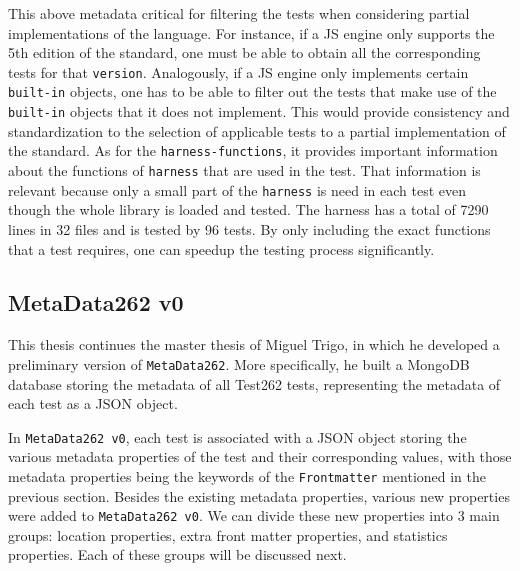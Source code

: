 \documentclass[runningheads]{llncs}
\begin{document}
This above metadata critical for filtering the tests when considering partial implementations of the language. For instance, if a JS engine only supports the 5th edition of the standard, one must be able to obtain all the corresponding tests for that \texttt{version}. Analogously, if a JS engine only implements certain \texttt{built-in} objects, one has to be able to filter out the tests that make use of the \texttt{built-in} objects that it does not implement. This would provide consistency and standardization to the selection of applicable tests to a partial implementation of the standard.
%
As for the \texttt{harness-functions}, it provides important information about the functions of \texttt{harness} that are used in the test. That information is relevant because only a small part of the \texttt{harness} is need in each test even though the whole library is loaded and tested. The harness has a total of 7290 lines in 32 files and is tested by 96 tests. By only including the exact functions that a test requires, one can speedup the testing process significantly.



\subsection{MetaData262 v0}
\label{subsec:MetaData262 v0}



This thesis continues the master thesis of Miguel Trigo\cite{Thesis_Miguel_Trigo}, in which he developed a preliminary version of \texttt{MetaData262}. More specifically, he built a MongoDB database storing the metadata of all Test262 tests, representing the metadata of each test as a JSON object.



In \texttt{MetaData262 v0}, each test is associated with a JSON object storing the various metadata properties of the test and their corresponding values, with those metadata properties being the keywords of the \texttt{Frontmatter} mentioned in the previous section.
%
Besides the existing metadata properties, various new properties were added to \texttt{MetaData262 v0}. We can divide these new properties into 3 main groups: location properties, extra front matter properties, and statistics properties. Each of these groups will be discussed next.
\end{document}
